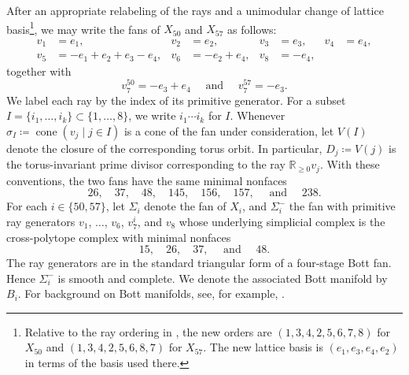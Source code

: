 \documentclass{amsart}
\numberwithin{equation}{section}
\theoremstyle{definition}
\newcommand{\R}{\mathbb R}
\newcommand{\wideand}{ \quad \text{ and } \quad }
\DeclareMathOperator{\cone}{cone}
\begin{document}
After an appropriate relabeling of the rays and a unimodular change of lattice basis\footnote{Relative to the ray ordering in \cite[Table~27]{Higashitani-Kurimoto-Masuda2022}, the new orders are $(1,3,4,2,5,6,7,8)$ for $X_{50}$ and $(1,3,4,2,5,6,8,7)$ for $X_{57}$. The new lattice basis is $(e_1,e_3,e_4,e_2)$ in terms of the basis used there.}, we may write the fans of $X_{50}$ and $X_{57}$ as follows:
\begin{align*}
    v_1&=e_1,& v_2&=e_2,& v_3&=e_3,& v_4&=e_4,\\
    v_5&=-e_1+e_2+e_3-e_4,& v_6&=-e_2+e_4,& v_8&=-e_4,
\end{align*}
together with
$$
    v_7^{50}=-e_3+e_4 \wideand v_7^{57}=-e_3.
$$
We label each ray by the index of its primitive generator. 
For a subset $I=\{i_1,\ldots,i_k\}\subset \{1,\ldots,8\}$, we write $i_1\cdots i_k$ for $I$. 
Whenever $\sigma_I \coloneq \cone(v_j\mid j\in I)$ is a cone of the fan under consideration, let $V(I)$ denote the closure of the corresponding torus orbit. 
In particular, $D_j \coloneq V(j)$ is the torus-invariant prime divisor corresponding to the ray $\R_{\geq 0}v_j$.
With these conventions, the two fans have the same minimal nonfaces
$$
    26,\quad 37,\quad 48,\quad 145,\quad 156,\quad 157, \wideand 238.
$$
For each $i\in\{50,57\}$, let $\Sigma_i$ denote the fan of $X_i$, and $\Sigma_i^-$ the fan with primitive ray generators $v_1$, $\ldots$, $v_6$, $v_7^i$, and $v_8$ whose underlying simplicial complex is the cross-polytope complex with minimal nonfaces
\begin{equation}\label{eq:B-mnf}
    15,\quad 26,\quad 37, \wideand 48.
\end{equation}
The ray generators are in the standard triangular form of a four-stage Bott fan. 
Hence $\Sigma_i^-$ is smooth and complete. 
We denote the associated Bott manifold by~$B_i$.
For background on Bott manifolds, see, for example, \cite{Grossberg-Karshon1994, Masuda-Panov2008,Choi-Hwang-Jang2025}.
\end{document}
